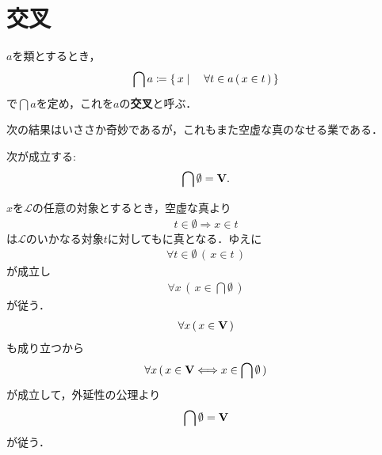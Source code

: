 \section{交叉}
	\begin{screen}
		\begin{dfn}[交叉]
			$a$を類とするとき，
			\begin{align}
				\bigcap a \coloneqq \left\{\, x \mid \quad \forall t \in a\, (\, x \in t\, )\, \right\}
			\end{align}
			で$\bigcap a$を定め，これを$a$の{\bf 交叉}と呼ぶ．
		\end{dfn}
	\end{screen}
	
	次の結果はいささか奇妙であるが，これもまた空虚な真のなせる業である．
	
	\begin{screen}
		\begin{thm}[空集合の交叉は宇宙となる]\label{thm:union_of_the_emptyset_is_the_Universe}
			次が成立する:
			\begin{align}
				\bigcap \emptyset = \mathbf{V}.
			\end{align}
		\end{thm}
	\end{screen}
	
	\begin{prf}
		$x$を$\mathcal{L}$の任意の対象とするとき，空虚な真より
		\begin{align}
			t \in \emptyset \Longrightarrow x \in t
		\end{align}
		は$\mathcal{L}$のいかなる対象$t$に対してもに真となる．ゆえに
		\begin{align}
			\forall t \in \emptyset\, (\, x \in t\, )
		\end{align}
		が成立し
		\begin{align}
			\forall x\, (\, x \in \bigcap \emptyset\, )
		\end{align}
		が従う．
		\begin{align}
			\forall x\, (\, x \in \mathbf{V}\, )
		\end{align}
		も成り立つから
		\begin{align}
			\forall x\, (\, x \in \mathbf{V} \Longleftrightarrow x \in \bigcap \emptyset\, )
		\end{align}
		が成立して，外延性の公理より
		\begin{align}
			\bigcap \emptyset = \mathbf{V}
		\end{align}
		が従う．
		\QED
	\end{prf}
	

